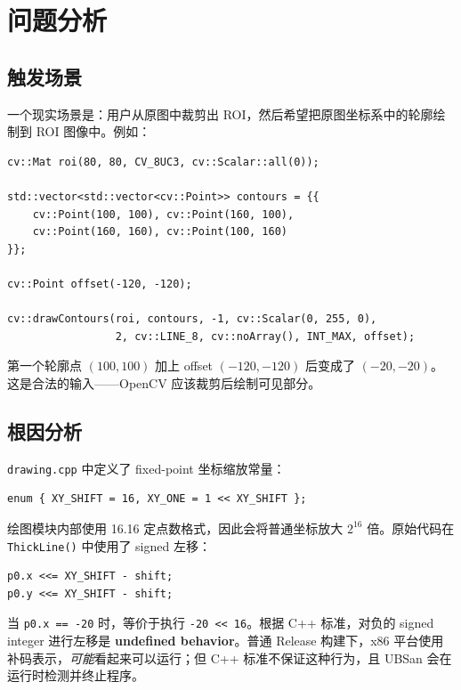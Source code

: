\documentclass[12pt,a4paper]{article}
\begin{document}
\section{问题分析}

\subsection{触发场景}

一个现实场景是：用户从原图中裁剪出 ROI，然后希望把原图坐标系中的轮廓绘制到 ROI 图像中。例如：

\begin{lstlisting}
cv::Mat roi(80, 80, CV_8UC3, cv::Scalar::all(0));

std::vector<std::vector<cv::Point>> contours = {{
    cv::Point(100, 100), cv::Point(160, 100),
    cv::Point(160, 160), cv::Point(100, 160)
}};

cv::Point offset(-120, -120);

cv::drawContours(roi, contours, -1, cv::Scalar(0, 255, 0),
                 2, cv::LINE_8, cv::noArray(), INT_MAX, offset);
\end{lstlisting}

第一个轮廓点 $(100, 100)$ 加上 offset $(-120, -120)$ 后变成了 $(-20, -20)$。这是合法的输入——OpenCV 应该裁剪后绘制可见部分。

\subsection{根因分析}

\texttt{drawing.cpp} 中定义了 fixed-point 坐标缩放常量：

\begin{lstlisting}
enum { XY_SHIFT = 16, XY_ONE = 1 << XY_SHIFT };
\end{lstlisting}

绘图模块内部使用 16.16 定点数格式，因此会将普通坐标放大 $2^{16}$ 倍。原始代码在 \texttt{ThickLine()} 中使用了 signed 左移：

\begin{lstlisting}
p0.x <<= XY_SHIFT - shift;
p0.y <<= XY_SHIFT - shift;
\end{lstlisting}

当 \texttt{p0.x == -20} 时，等价于执行 \texttt{-20 << 16}。根据 C++ 标准，对负的 signed integer 进行左移是 \textbf{undefined behavior}。普通 Release 构建下，x86 平台使用补码表示，\emph{可能}看起来可以运行；但 C++ 标准不保证这种行为，且 UBSan 会在运行时检测并终止程序。
\end{document}
